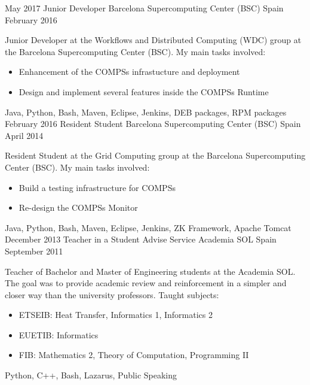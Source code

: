 \begin{experiences}
        {May 2017}
        {Junior Developer}
        {Barcelona Supercomputing Center (BSC)}
        {Spain}
        {February 2016}
        {Junior Developer at the Workflows and Distributed Computing (WDC) group at the Barcelona Supercomputing Center (BSC). My main tasks involved:
        \begin{itemize}
            \item Enhancement of the COMPSs infrastucture and deployment
            \item Design and implement several features inside the COMPSs Runtime
        \end{itemize}
        }
        {Java, Python, Bash, Maven, Eclipse, Jenkins, DEB packages, RPM packages}
    \emptySeparator
    \experience
        {February 2016}
        {Resident Student}
        {Barcelona Supercomputing Center (BSC)}
        {Spain}
        {April 2014}
        {Resident Student at the Grid Computing group at the Barcelona Supercomputing Center (BSC). My main tasks involved:
        \begin{itemize}
            \item Build a testing infrastructure for COMPSs
            \item Re-design the COMPSs Monitor
        \end{itemize}
        }
        {Java, Python, Bash, Maven, Eclipse, Jenkins, ZK Framework, Apache Tomcat}
    \emptySeparator
    \experience
        {December 2013}
        {Teacher in a Student Advise Service}
        {Academia SOL}
        {Spain}
        {September 2011}
        {Teacher of Bachelor and Master of Engineering students at the Academia SOL. The goal was to provide academic review and reinforcement in a simpler and closer way than the university professors. Taught subjects:
        \begin{itemize}
            \item ETSEIB: Heat Transfer, Informatics 1, Informatics 2
            \item EUETIB: Informatics
            \item FIB: Mathematics 2, Theory of Computation, Programming II
        \end{itemize}
        }
        {Python, C++, Bash, Lazarus, Public Speaking}

\end{experiences}
